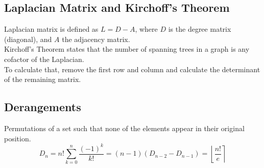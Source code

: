     \subsection{Laplacian Matrix and Kirchoff’s Theorem}

    Laplacian matrix is defined as $L = D - A$, where $D$ is the degree matrix (diagonal), and $A$ the adjacency matrix.\\
    Kirchoff’s Theorem states that the number of spanning trees in a graph is any cofactor of the Laplacian.\\
    To calculate that, remove the first row and column and calculate the determinant of the remaining matrix.

    \subsection{Derangements}
		Permutations of a set such that none of the elements appear in their original position.
    $$D_n = n!\sum_{k=0}^n \frac{(-1)^k}{k!} = (n-1)(D_{n-2}-D_{n-1}) = \left\lfloor\frac{n!}{e}\right\rceil$$




